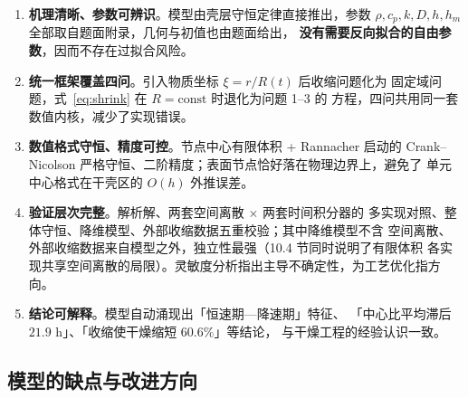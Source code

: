 \begin{enumerate}
    \item \textbf{机理清晰、参数可辨识}。模型由壳层守恒定律直接推出，参数
  $\rho,c_p,k,D,h,h_m$ 全部取自题面附录，几何与初值也由题面给出，
  \textbf{没有需要反向拟合的自由参数}，因而不存在过拟合风险。
  \item \textbf{统一框架覆盖四问}。引入物质坐标 $\xi=r/R(t)$ 后收缩问题化为
  固定域问题，式~\eqref{eq:shrink} 在 $R=\text{const}$ 时退化为问题 1--3 的
  方程，四问共用同一套数值内核，减少了实现错误。
  \item \textbf{数值格式守恒、精度可控}。节点中心有限体积 + Rannacher 启动的
  Crank--Nicolson 严格守恒、二阶精度；表面节点恰好落在物理边界上，避免了
  单元中心格式在干壳区的 $O(h)$ 外推误差。
  \item \textbf{验证层次完整}。解析解、两套空间离散 $\times$ 两套时间积分器的
  多实现对照、整体守恒、降维模型、外部收缩数据五重校验；其中降维模型不含
  空间离散、外部收缩数据来自模型之外，独立性最强（10.4 节同时说明了有限体积
  各实现共享空间离散的局限）。灵敏度分析指出主导不确定性，为工艺优化指方向。
  \item \textbf{结论可解释}。模型自动涌现出「恒速期—降速期」特征、
  「中心比平均滞后 $21.9$ h」、「收缩使干燥缩短 $60.6\%$」等结论，
    与干燥工程的经验认识一致。
\end{enumerate}

\subsection{模型的缺点与改进方向}

